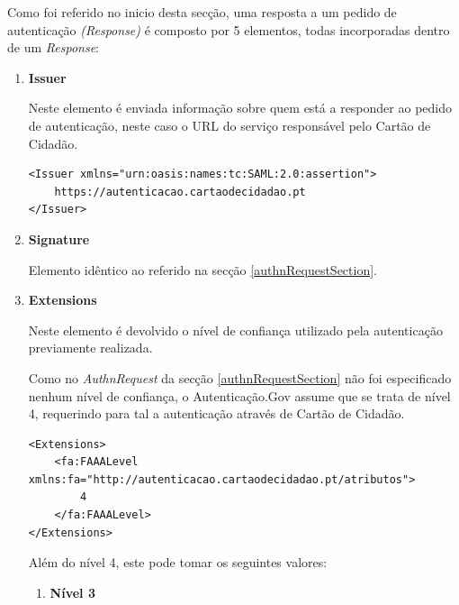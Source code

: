 Como foi referido no inicio desta secção, uma resposta a um pedido de autenticação \emph{(Response)} é composto por 5 elementos, todas incorporadas dentro de um \emph{Response}:

\begin{enumerate}
    \item \textbf{Issuer}
    
    Neste elemento é enviada informação sobre quem está a responder ao pedido de autenticação, neste caso o URL do serviço responsável pelo Cartão de Cidadão.
    
    \begin{lstlisting}
<Issuer xmlns="urn:oasis:names:tc:SAML:2.0:assertion">
    https://autenticacao.cartaodecidadao.pt
</Issuer>
    \end{lstlisting}
    
    \item \textbf{Signature}
    
    Elemento idêntico ao referido na secção \ref{authnRequestSection}.
    
    \item \textbf{Extensions}
    
    Neste elemento é devolvido o nível de confiança utilizado pela autenticação previamente realizada. 
    
    Como no \emph{AuthnRequest} da secção \ref{authnRequestSection} não foi especificado nenhum nível de confiança, o Autenticação.Gov assume que se trata de nível 4, requerindo para tal a autenticação através de Cartão de Cidadão.
    
    \begin{lstlisting}
<Extensions>
    <fa:FAAALevel xmlns:fa="http://autenticacao.cartaodecidadao.pt/atributos">
        4
    </fa:FAAALevel>
</Extensions>
    \end{lstlisting}
    
    \vspace{-10mm}
    Além do nível 4, este pode tomar os seguintes valores:
    
    \begin{enumerate}
        \item \textbf{Nível 3}
        

\end{enumerate}
\end{enumerate}
